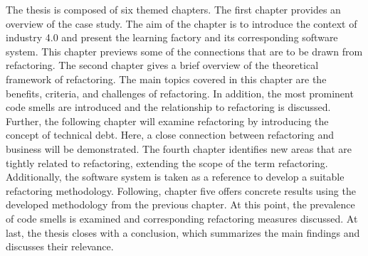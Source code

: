 The thesis is composed of six themed chapters. The first chapter provides an overview of the case study. The aim of the chapter is to introduce the context of industry 4.0 and present the learning factory and its corresponding software system. This chapter previews some of the connections that are to be drawn from refactoring. The second chapter gives a brief overview of the theoretical framework of refactoring. The main topics covered in this chapter are the benefits, criteria, and challenges of refactoring. In addition, the most prominent code smells are introduced and the relationship to refactoring is discussed. Further, the following chapter will examine refactoring by introducing the concept of technical debt. Here, a close connection between refactoring and business will be demonstrated. The fourth chapter identifies new areas that are tightly related to refactoring, extending the scope of the term refactoring. Additionally, the software system is taken as a reference to develop a suitable refactoring methodology. Following, chapter five offers concrete results using the developed methodology from the previous chapter. At this point, the prevalence of code smells is examined and corresponding refactoring measures discussed. At last, the thesis closes with a conclusion, which summarizes the main findings and discusses their relevance. 